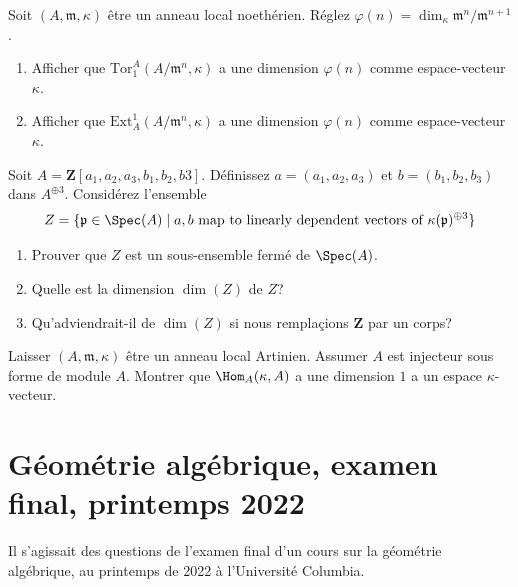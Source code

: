 \begin{exercise}
\label{exercise-compute-tor-ext}
Soit $(A, \mathfrak m, \kappa)$ être un anneau local
noethérien. Réglez $\varphi(n) = \dim_\kappa \mathfrak m^n/\mathfrak m^{n + 1}$.
\begin{enumerate}
\item Afficher que $\text{Tor}_1^A(A/\mathfrak m^n, \kappa)$ a
une dimension $\varphi(n)$ comme espace-vecteur $\kappa$.
\item Afficher que $\text{Ext}^1_A(A/\mathfrak m^n, \kappa)$ a
une dimension $\varphi(n)$ comme espace-vecteur $\kappa$.
\end{enumerate}
\end{exercise}

\begin{exercise}
\label{exercise-two-vectors}
Soit $A = \mathbf{Z}[a_1, a_2, a_3, b_1, b_2, b3]$. Définissez
$a = (a_1, a_2, a_3)$ et $b = (b_1, b_2, b_3)$ dans $A^{\oplus
3}$. Considérez l'ensemble
$$
Z = \{\mathfrak p \in \Spec(A) \mid a, b
\text{ map to linearly dependent vectors of }
\kappa(\mathfrak p)^{\oplus 3}\}
$$
\begin{enumerate}
\item Prouver que $Z$ est un sous-ensemble fermé de $\Spec(A)$.
\item Quelle est la dimension $\dim(Z)$ de $Z$?
\item Qu'adviendrait-il de $\dim(Z)$ si nous remplaçions $\mathbf{Z}$ par un corps?
\end{enumerate}
\end{exercise}

\begin{exercise}[Injectives]
\label{exercise-injective-artinian-local}
Laisser $(A, \mathfrak m, \kappa)$ être un anneau local Artinien.
Assumer $A$ est injecteur sous forme de module $A$.
Montrer que $\Hom_A(\kappa, A)$ a une dimension $1$
a un espace $\kappa$-vecteur.
\end{exercise}



\section{ Géométrie algébrique, examen final, printemps 2022}
\label{section-final-exam-spring-2022}

\noindent
Il s'agissait des questions de l'examen final d'un cours sur la géométrie algébrique,
au printemps de 2022 à l'Université Columbia.

